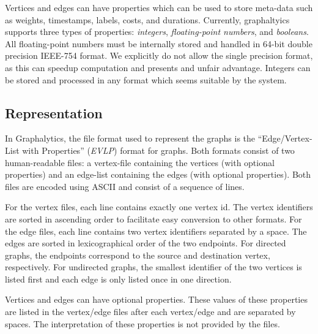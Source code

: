 Vertices and edges can have properties which can be used to store meta-data such as weights, timestamps, labels, costs, and durations. Currently, graphaltyics supports three types of properties: \emph{integers}, \emph{floating-point numbers}, and \emph{booleans}. All floating-point numbers must be internally stored and handled in 64-bit double precision IEEE-754 format. We explicitly do not allow the single precision format, as this can speedup computation and presents and unfair advantage. Integers can be stored and processed in any format which seems suitable by the system.


\subsection{Representation}\label{sec:data:representation}
In Graphalytics, the file format used to represent the graphs is the ``Edge/Vertex-List with Properties'' (\emph{EVLP}) format for graphs. Both formats consist of two human-readable files: a vertex-file containing the vertices (with optional properties) and an edge-list containing the edges (with optional properties). Both files are encoded using ASCII and consist of a sequence of lines.

For the vertex files, each line contains exactly one vertex id. The vertex identifiers are sorted in ascending order to facilitate easy conversion to other formats. For the edge files, each line contains two vertex identifiers separated by a space. The edges are sorted in lexicographical order of the two endpoints. For directed graphs, the endpoints correspond to the source and destination vertex, respectively. For undirected graphs, the smallest identifier of the two vertices is listed first and each edge is only listed once in one direction.

Vertices and edges can have optional properties. These values of these properties are listed in the vertex/edge files after each vertex/edge and are separated by spaces. The interpretation of these properties is not provided by the files.

